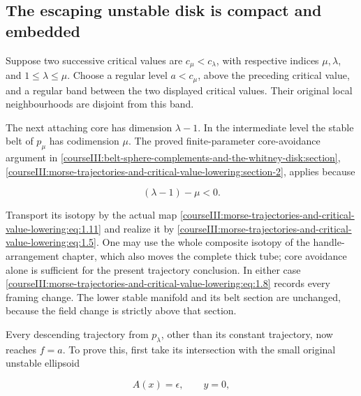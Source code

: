 \subsection{The escaping unstable disk is compact and embedded}
\label{courseIII:morse-trajectories-and-critical-value-lowering:trajectory-unstable-disk}

\label{courseIII:morse-trajectories-and-critical-value-lowering:section-2}\label{courseIII:trajectory-lowering:2}

Suppose two successive critical values are \(c_\mu<c_\lambda\), with respective indices \(\mu,\lambda\), and \(1\leq\lambda\leq\mu\). Choose a regular level \(a<c_\mu\), above the preceding critical value, and a regular band between the two displayed critical values. Their original local neighbourhoods are disjoint from this band.

The next attaching core has dimension \(\lambda-1\). In the intermediate level the stable belt of \(p_\mu\) has codimension \(\mu\). The proved finite-parameter core-avoidance argument in \cref{courseIII:belt-sphere-complements-and-the-whitney-disk:section}, \cref{courseIII:morse-trajectories-and-critical-value-lowering:section-2}, applies because

\begin{equation}
(\lambda-1)-\mu<0.
 \label{courseIII:morse-trajectories-and-critical-value-lowering:eq:2.1}
\end{equation}

Transport its isotopy by the actual map \eqref{courseIII:morse-trajectories-and-critical-value-lowering:eq:1.11} and realize it by \eqref{courseIII:morse-trajectories-and-critical-value-lowering:eq:1.5}. One may use the whole composite isotopy of the handle-arrangement chapter, which also moves the complete thick tube; core avoidance alone is sufficient for the present trajectory conclusion. In either case \eqref{courseIII:morse-trajectories-and-critical-value-lowering:eq:1.8} records every framing change. The lower stable manifold and its belt section are unchanged, because the field change is strictly above that section.

Every descending trajectory from \(p_\lambda\), other than its constant trajectory, now reaches \(f=a\). To prove this, first take its intersection with the small original unstable ellipsoid

\begin{equation}
A(x)=\epsilon,\qquad y=0,
 \label{courseIII:morse-trajectories-and-critical-value-lowering:eq:2.2}
\end{equation}

